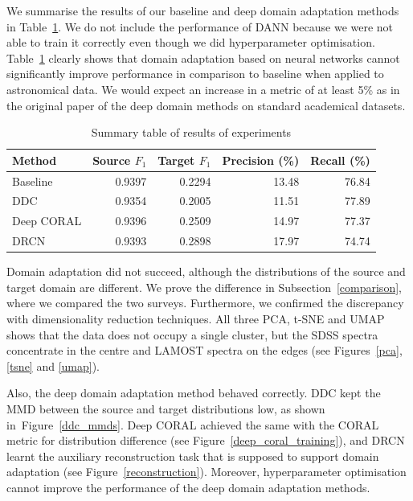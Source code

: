 We summarise the results of our baseline and deep domain adaptation methods in Table~\ref{summary}.
We do not include the performance of DANN
because we were not able to train it correctly even though we did hyperparameter optimisation.
Table~\ref{summary} clearly shows that domain adaptation based on neural networks cannot significantly improve performance in comparison to baseline
when applied to astronomical data.
We would expect an increase in a metric of at least 5\% as in the original paper of the deep domain methods on standard academical datasets.

\begin{table}
\begin{center}
\begin{tabular}{|l|r|r|r|r|}
	\hline
	Method & Source \(F_1\) & Target \(F_1\) & Precision (\%) & Recall (\%) \\
	\hline \hline
	Baseline & 0.9397 & 0.2294 & 13.48 & 76.84 \\ \hline
	DDC & 0.9354 & 0.2005 & 11.51 & 77.89 \\ \hline
	Deep CORAL & 0.9396 & 0.2509 & 14.97 & 77.37 \\ \hline
	DRCN & 0.9393 & 0.2898 & 17.97 & 74.74 \\ \hline
\end{tabular}
\end{center}
\caption{Summary table of results of experiments}
\label{summary}
\end{table}

Domain adaptation did not succeed,
although the distributions of the source and target domain are different.
We prove the difference in Subsection~\ref{comparison},
where we compared the two surveys.
Furthermore, we confirmed the discrepancy with dimensionality reduction techniques.
All three PCA, t-SNE and UMAP shows that the data does not occupy a single cluster,
but the SDSS spectra concentrate in the centre and LAMOST spectra on the edges
(see Figures~\ref{pca}, \ref{tsne} and \ref{umap}).

Also, the deep domain adaptation method behaved correctly.
DDC kept the MMD between the source and target distributions low,
as shown in~Figure~\ref{ddc_mmds}.
Deep CORAL achieved the same with the CORAL metric for distribution difference
(see Figure~\ref{deep_coral_training}),
and DRCN learnt the auxiliary reconstruction task
that is supposed to support domain adaptation
(see Figure~\ref{reconstruction}).
Moreover, hyperparameter optimisation cannot improve the performance of the deep domain adaptation methods.

